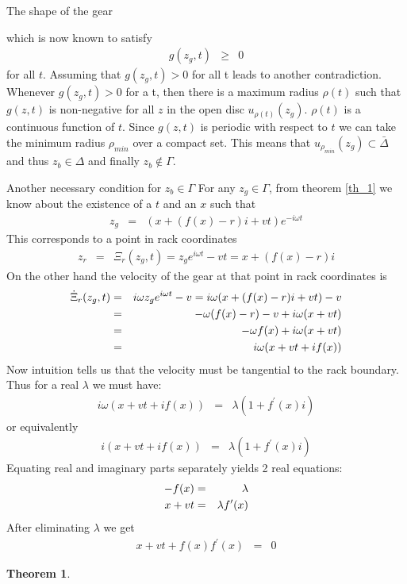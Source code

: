\documentclass[a4paper,fleqn]{article}
\newtheorem{theorem}{Theorem}[section]
\newenvironment{proof}[1][Proof]{\begin{trivlist}
\item[\hskip \labelsep {\bfseries #1}]}{\end{trivlist}}
\newcommand{\qed}{\nobreak \ifvmode \relax \else
      \ifdim\lastskip<1.5em \hskip-\lastskip
      \hskip1.5em plus0em minus0.5em \fi \nobreak
      \vrule height0.75em width0.5em depth0.25em\fi}
\numberwithin{equation}{section}
\begin{document}
\begin{subsection}{The shape of the gear}
\begin{proof}
which is now known to satisfy
\begin{eqnarray}
g(z_g,t) &\ge & 0
\end{eqnarray}
for all $t$. Assuming that $g(z_g,t) > 0$ for all t leads to another contradiction.
Whenever $g(z_g,t) > 0$ for a t, then there is a maximum radius $\rho(t)$ such that $g(z,t)$ is non-negative for all $z$ in the open disc $u_{\rho(t)}(z_g)$.
$\rho(t)$ is a continuous function of $t$. Since $g(z,t)$ is periodic with respect to $t$ we can take the minimum radius $\rho_{min}$ over a compact set. This means that $u_{\rho_{min}}(z_g)\subset \bar{\Delta}$
and thus $z_b\in \Delta$ and finally $z_b\notin \Gamma$.
\qed
\end{proof}
\begin{subsubsection}{Another necessary condition for $z_b\in \Gamma$}
For any $z_g\in \Gamma$, from theorem \ref{th_1} we know about the existence of a $t$ and an $x$ such that
\begin{eqnarray}
z_g &=& (x+(f(x)-r)i+vt)e^{-i\omega t}
\end{eqnarray}
This corresponds to a point in rack coordinates
\begin{eqnarray}
z_r&=&\Xi_r(z_g,t)=z_ge^{i\omega t}-vt=x+(f(x)-r)i
\end{eqnarray}
On the other hand the velocity of the gear at that point in rack coordinates is
\begin{eqnarray}
\label{contact_vel}
	\dot{\Xi}_r(z_g,t) &=& i\omega z_ge^{i\omega t}-v= i\omega (x+(f(x)-r)i+vt)-v\cr
	&=& -\omega(f(x)-r)-v+i\omega(x+vt)\cr
	&=& -\omega f(x)+i\omega(x+vt)\cr
	&=& i\omega( x+vt+if(x))
\end{eqnarray}
Now intuition tells us that the velocity must be tangential to the rack boundary. Thus for a real $\lambda$ we must have:
\begin{eqnarray}
i\omega( x+vt+if(x)) &=& \lambda (1+f^\prime(x)i)
\end{eqnarray}
or equivalently
\begin{eqnarray}
i( x+vt+if(x)) &=& \lambda (1+f^\prime(x)i)
\end{eqnarray}
Equating real and imaginary parts	separately yields 2 real equations:
\begin{eqnarray}
-f(x) &=& \lambda\cr
x+vt &=& \lambda f^\prime(x)
\end{eqnarray}
After eliminating $\lambda$ we get
\begin{eqnarray}
\label{prop3}
x+vt+f(x)f^\prime(x) &=& 0
\end{eqnarray}
\begin{theorem}

\end{theorem}
\end{subsubsection}
\end{subsection}
\end{document}
